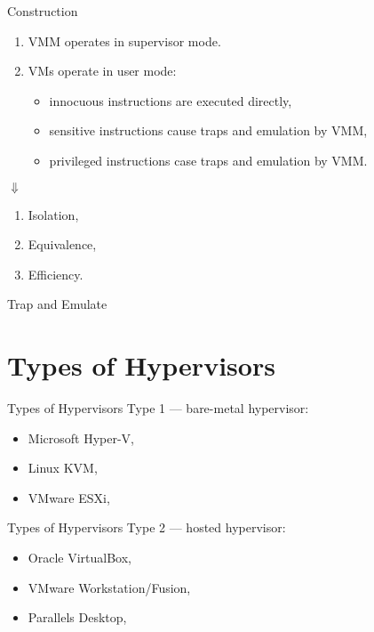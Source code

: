 \begin{frame}{Construction}
\begin{enumerate}
\item VMM operates in supervisor mode.
\item VMs operate in user mode:
  \begin{itemize}
  \item innocuous instructions are executed directly,
  \item sensitive instructions cause traps and emulation by VMM,
  \item privileged instructions case traps and emulation by VMM.
  \end{itemize}
\end{enumerate}
\pause
\centering$\Downarrow$
\begin{enumerate}
  \item Isolation,
  \item Equivalence,
  \item Efficiency.
\end{enumerate}
\end{frame}

\begin{frame}{Trap and Emulate}
\centering
{}
\end{frame}

\section{Types of Hypervisors}

\begin{frame}{Types of Hypervisors}
Type 1 --- bare-metal hypervisor:
\vfill
\centering
{}
\vfill
\begin{itemize}
\item Microsoft Hyper-V,
\item Linux KVM,
\item VMware ESXi,
\end{itemize}
\end{frame}

\begin{frame}{Types of Hypervisors}
Type 2 --- hosted hypervisor:
\vfill
\centering
{}
\vfill
\begin{itemize}
\item Oracle VirtualBox,
\item VMware Workstation/Fusion,
\item Parallels Desktop,
\end{itemize}
\end{frame}


